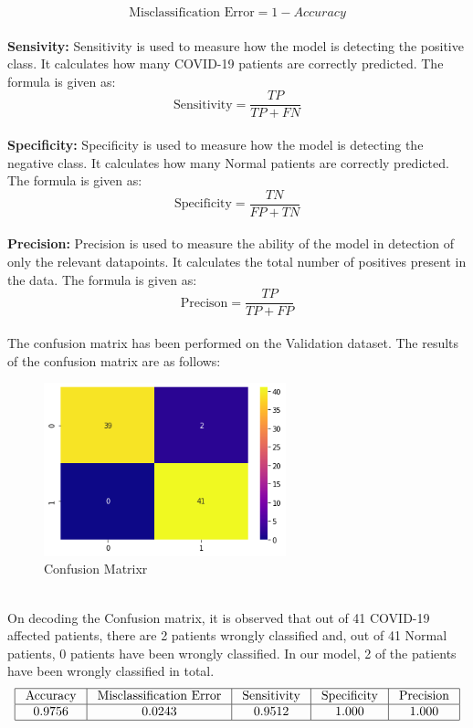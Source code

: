 \documentclass[12pt]{revtex4}
\begin{document}
\begin{equation}\text{Misclassification Error} = 1 - Accuracy\end{equation}
\\\textbf{Sensivity: } Sensitivity is used to measure how the model is detecting the positive class. It calculates how many COVID-19 patients are correctly predicted. The formula is given as:
\begin{equation}\text {Sensitivity}=\frac{T P}{T P+F N}\end{equation}
\\\textbf{Specificity: } Specificity is used to measure how the model is detecting the negative class. It calculates how many Normal patients are correctly predicted. The formula is given as:
\begin{equation}\text {Specificity}=\frac{T N}{F P+T N}\end{equation}
\\\textbf{Precision:} Precision is used to measure the ability of the model in detection of only the relevant datapoints. It calculates the total number of positives present in the data. The formula is given as:
\begin{equation}\text{Precison}=\frac{ TP}{T P+F P}\end{equation}
\\The confusion matrix has been performed on the Validation dataset. The results of the confusion matrix are as follows:
\begin{figure}[htp]
    \centering
    \includegraphics[width=7cm]{ConfusionMatrix.png}
    \caption{Confusion Matrixr}
    \label{fig:abc}
\end{figure}
\\On decoding the Confusion matrix, it is observed that out of 41 COVID-19 affected patients, there are 2 patients wrongly classified and, out of 41 Normal patients, 0 patients have been wrongly classified. In our model, 2 of the patients have been wrongly classified in total. 
$$\begin{array}{|c|c|c|c|c|}
\hline \text { Accuracy } & \text { Misclassification Error } & \text { Sensitivity } & \text { Specificity } & \text { Precision } \\
\hline 0.9756 & 0.0243 & 0.9512 & 1.000 & 1.000 \\
\hline
\end{array}$$
\end{document}
